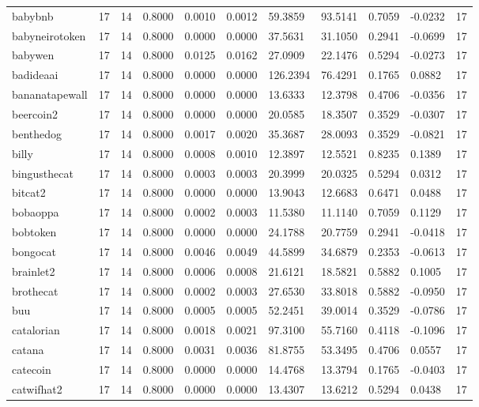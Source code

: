 \begin{table}[htbp]
\begin{tabular}{lllllllllll}
babybnb & 17 & 14 & 0.8000 & 0.0010 & 0.0012 & 59.3859 & 93.5141 & 0.7059 & -0.0232 & 17 \\
babyneirotoken & 17 & 14 & 0.8000 & 0.0000 & 0.0000 & 37.5631 & 31.1050 & 0.2941 & -0.0699 & 17 \\
babywen & 17 & 14 & 0.8000 & 0.0125 & 0.0162 & 27.0909 & 22.1476 & 0.5294 & -0.0273 & 17 \\
badideaai & 17 & 14 & 0.8000 & 0.0000 & 0.0000 & 126.2394 & 76.4291 & 0.1765 & 0.0882 & 17 \\
bananatapewall & 17 & 14 & 0.8000 & 0.0000 & 0.0000 & 13.6333 & 12.3798 & 0.4706 & -0.0356 & 17 \\
beercoin2 & 17 & 14 & 0.8000 & 0.0000 & 0.0000 & 20.0585 & 18.3507 & 0.3529 & -0.0307 & 17 \\
benthedog & 17 & 14 & 0.8000 & 0.0017 & 0.0020 & 35.3687 & 28.0093 & 0.3529 & -0.0821 & 17 \\
billy & 17 & 14 & 0.8000 & 0.0008 & 0.0010 & 12.3897 & 12.5521 & 0.8235 & 0.1389 & 17 \\
bingusthecat & 17 & 14 & 0.8000 & 0.0003 & 0.0003 & 20.3999 & 20.0325 & 0.5294 & 0.0312 & 17 \\
bitcat2 & 17 & 14 & 0.8000 & 0.0000 & 0.0000 & 13.9043 & 12.6683 & 0.6471 & 0.0488 & 17 \\
bobaoppa & 17 & 14 & 0.8000 & 0.0002 & 0.0003 & 11.5380 & 11.1140 & 0.7059 & 0.1129 & 17 \\
bobtoken & 17 & 14 & 0.8000 & 0.0000 & 0.0000 & 24.1788 & 20.7759 & 0.2941 & -0.0418 & 17 \\
bongocat & 17 & 14 & 0.8000 & 0.0046 & 0.0049 & 44.5899 & 34.6879 & 0.2353 & -0.0613 & 17 \\
brainlet2 & 17 & 14 & 0.8000 & 0.0006 & 0.0008 & 21.6121 & 18.5821 & 0.5882 & 0.1005 & 17 \\
brothecat & 17 & 14 & 0.8000 & 0.0002 & 0.0003 & 27.6530 & 33.8018 & 0.5882 & -0.0950 & 17 \\
buu & 17 & 14 & 0.8000 & 0.0005 & 0.0005 & 52.2451 & 39.0014 & 0.3529 & -0.0786 & 17 \\
catalorian & 17 & 14 & 0.8000 & 0.0018 & 0.0021 & 97.3100 & 55.7160 & 0.4118 & -0.1096 & 17 \\
catana & 17 & 14 & 0.8000 & 0.0031 & 0.0036 & 81.8755 & 53.3495 & 0.4706 & 0.0557 & 17 \\
catecoin & 17 & 14 & 0.8000 & 0.0000 & 0.0000 & 14.4768 & 13.3794 & 0.1765 & -0.0403 & 17 \\
catwifhat2 & 17 & 14 & 0.8000 & 0.0000 & 0.0000 & 13.4307 & 13.6212 & 0.5294 & 0.0438 & 17 \\

\end{tabular}
\end{table}
